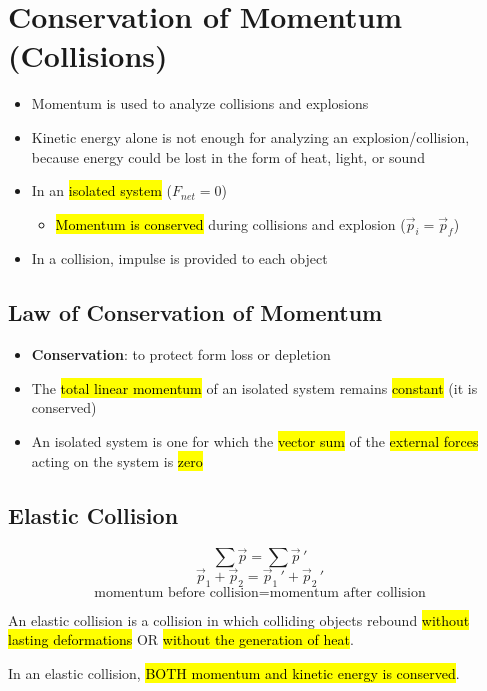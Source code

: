 \documentclass[a4paper,12pt]{article}
\begin{document}
\section{Conservation of Momentum (Collisions)}
\begin{itemize}
    \item{Momentum is used to analyze collisions and explosions}
    \item{Kinetic energy alone is not enough for analyzing an explosion/collision, because energy could be lost in the form of heat, light, or sound}
    \item{
        In an \hl{isolated system} ($F_{net} = 0$)
        \begin{itemize}
            \item{\hl{Momentum is conserved} during collisions and explosion ($\vec{p}_i = \vec{p}_f$)}
        \end{itemize}
    }
    \item{In a collision, impulse is provided to each object}
\end{itemize}

\subsection{Law of Conservation of Momentum}
\begin{itemize}
    \item{\textbf{Conservation}: to protect form loss or depletion}
    \item{The \hl{total linear momentum} of an isolated system remains \hl{constant} (it is conserved)}
    \item{An isolated system is one for which the \hl{vector sum} of the \hl{external forces} acting on the system is \hl{zero}}
\end{itemize}

\subsection{Elastic Collision}
$$\sum\vec{p} = \sum\vec{p}\,'$$
$$\vec{p}_1 + \vec{p}_2 = \vec{p}_1\,\!' + \vec{p}_2\,\!'$$
$$\textrm{momentum before collision} = \textrm{momentum after collision}$$

An elastic collision is a collision in which colliding objects rebound \hl{without lasting deformations} OR \hl{without the generation of heat}.

In an elastic collision, \hl{BOTH momentum and kinetic energy is conserved}.
\end{document}
